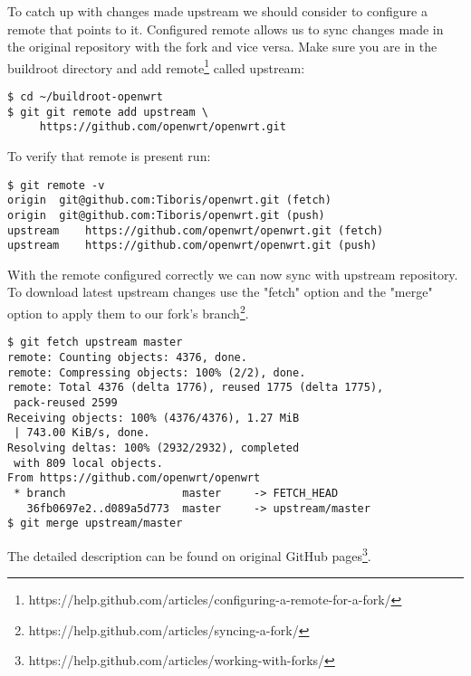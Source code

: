 To catch up with changes made upstream we should consider to configure a remote that points to it.
Configured remote allows us to sync changes made in the original repository with the fork and vice versa.
Make sure you are in the buildroot directory and add remote\footnote{https://help.github.com/articles/configuring-a-remote-for-a-fork/} called upstream:
\begin{lstlisting}[columns=fixed,basicstyle=\ttfamily\footnotesize,basicstyle=\ttfamily\footnotesize,tabsize=4,backgroundcolor=\color{yellow!10}]
$ cd ~/buildroot-openwrt
$ git git remote add upstream \
     https://github.com/openwrt/openwrt.git
\end{lstlisting}
To verify that remote is present run:
\begin{lstlisting}[columns=fixed,basicstyle=\ttfamily\footnotesize,basicstyle=\ttfamily\footnotesize,tabsize=4,backgroundcolor=\color{yellow!10}]
$ git remote -v
origin	git@github.com:Tiboris/openwrt.git (fetch)
origin	git@github.com:Tiboris/openwrt.git (push)
upstream	https://github.com/openwrt/openwrt.git (fetch)
upstream	https://github.com/openwrt/openwrt.git (push)
\end{lstlisting}
With the remote configured correctly we can now sync with
 upstream repository.
To download latest upstream changes use the "fetch" option
 and  the "merge" option to apply them to our fork's branch\footnote{https://help.github.com/articles/syncing-a-fork/}.
\begin{lstlisting}[columns=fixed,basicstyle=\ttfamily\footnotesize,basicstyle=\ttfamily\footnotesize,tabsize=4,backgroundcolor=\color{yellow!10}]
$ git fetch upstream master
remote: Counting objects: 4376, done.
remote: Compressing objects: 100% (2/2), done.
remote: Total 4376 (delta 1776), reused 1775 (delta 1775),
 pack-reused 2599
Receiving objects: 100% (4376/4376), 1.27 MiB
 | 743.00 KiB/s, done.
Resolving deltas: 100% (2932/2932), completed
 with 809 local objects.
From https://github.com/openwrt/openwrt
 * branch                  master     -> FETCH_HEAD
   36fb0697e2..d089a5d773  master     -> upstream/master
$ git merge upstream/master
\end{lstlisting}
The detailed description can be found on original GitHub pages\footnote{https://help.github.com/articles/working-with-forks/}.
